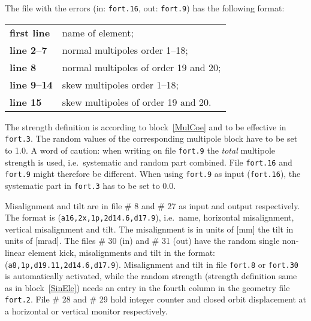 The file with the errors (in: \texttt{fort.16}, out: \texttt{fort.9}) has the following format:

\bigskip
\begin{tabular}{ll}
    \textbf{first line} & name of element; \\
    \textbf{line 2--7}  & normal multipoles order 1--18; \\
    \textbf{line 8}     & normal multipoles of order 19 and 20; \\
    \textbf{line 9--14} & skew multipoles order 1--18; \\
    \textbf{line 15}    & skew multipoles of order 19 and 20.
\end{tabular}

\bigskip
The strength definition is according to block~\ref{MulCoe} and to be effective in \texttt{fort.3}.
The random values of the corresponding multipole block have to be set to 1.0.
A word of caution: when writing on file \texttt{fort.9} the \textit{total} multipole strength is used, i.e.\ systematic and random part combined.
File \texttt{fort.16} and \texttt{fort.9} might therefore be different.
When using \texttt{fort.9} as input (\texttt{fort.16}), the systematic part in \texttt{fort.3} has to be set to 0.0.

Misalignment and tilt are in file \# 8 and \# 27 as input and output respectively.
The format is (\texttt{a16,2x,1p,2d14.6,d17.9}), i.e.\ name, horizontal misalignment, vertical misalignment and tilt.
The misalignment is in units of [mm] the tilt in units of [mrad].
The files \# 30 (in) and \# 31 (out) have the random single non-linear element kick, misalignments and tilt in the format: (\texttt{a8,1p,d19.11,2d14.6,d17.9}).
Misalignment and tilt in file \texttt{fort.8} or \texttt{fort.30} is automatically activated, while the random strength (strength definition same as in block~\ref{SinEle}) needs an entry in the fourth column in the geometry file \texttt{fort.2}.
File \# 28 and \# 29 hold integer counter and closed orbit displacement at a horizontal or vertical monitor respectively. 

 \setcounter{dst}{0}

